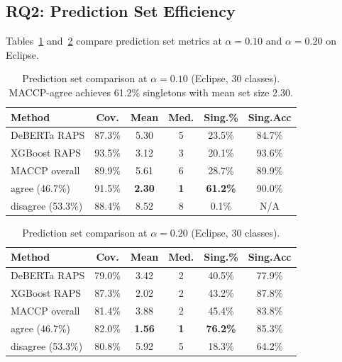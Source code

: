 \documentclass[conference]{IEEEtran}
\begin{document}
\subsection{RQ2: Prediction Set Efficiency}\label{sec:rq2}

Tables~\ref{tab:rq2-alpha10} and~\ref{tab:rq2-alpha20} compare prediction set metrics at $\alpha = 0.10$ and $\alpha = 0.20$ on Eclipse.

\begin{table}[t]
\caption{Prediction set comparison at $\alpha = 0.10$ (Eclipse, 30 classes). MACCP-agree achieves 61.2\% singletons with mean set size 2.30.}
\label{tab:rq2-alpha10}
\centering
\footnotesize
\setlength{\tabcolsep}{2.5pt}
\begin{tabular}{@{}lccccc@{}}
\toprule
\textbf{Method} & \textbf{Cov.} & \textbf{Mean} & \textbf{Med.} & \textbf{Sing.\%} & \textbf{Sing.Acc} \\
\midrule
DeBERTa RAPS       & 87.3\% & 5.30 & 5 & 23.5\% & 84.7\% \\
XGBoost RAPS        & 93.5\% & 3.12 & 3 & 20.1\% & 93.6\% \\
\midrule
MACCP overall       & 89.9\% & 5.61 & 6 & 28.7\% & 89.9\% \\
\quad agree (46.7\%)  & 91.5\% & \textbf{2.30} & \textbf{1} & \textbf{61.2\%} & 90.0\% \\
\quad disagree (53.3\%) & 88.4\% & 8.52 & 8 & 0.1\%  & N/A    \\
\bottomrule
\end{tabular}
\end{table}

\begin{table}[t]
\caption{Prediction set comparison at $\alpha = 0.20$ (Eclipse, 30 classes).}
\label{tab:rq2-alpha20}
\centering
\footnotesize
\setlength{\tabcolsep}{2.5pt}
\begin{tabular}{@{}lccccc@{}}
\toprule
\textbf{Method} & \textbf{Cov.} & \textbf{Mean} & \textbf{Med.} & \textbf{Sing.\%} & \textbf{Sing.Acc} \\
\midrule
DeBERTa RAPS       & 79.0\% & 3.42 & 2 & 40.5\% & 77.9\% \\
XGBoost RAPS        & 87.3\% & 2.02 & 2 & 43.2\% & 87.8\% \\
\midrule
MACCP overall       & 81.4\% & 3.88 & 2 & 45.4\% & 83.8\% \\
\quad agree (46.7\%)  & 82.0\% & \textbf{1.56} & \textbf{1} & \textbf{76.2\%} & 85.3\% \\
\quad disagree (53.3\%) & 80.8\% & 5.92 & 5 & 18.3\% & 64.2\% \\
\bottomrule
\end{tabular}
\end{table}
\end{document}
